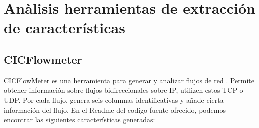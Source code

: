 \section{Anàlisis herramientas de extracción de características}

\subsection{CICFlowmeter}

CICFlowMeter es una herramienta para generar y analizar flujos de red \cite{cicflowpost}. Permite obtener información sobre flujos bidireccionales sobre IP, utilizen estos TCP o UDP. Por cada flujo, genera seis columnas identificativas y añade cierta información del flujo. En el Readme del codigo fuente ofrecido, podemos encontrar las siguientes características generadas:

